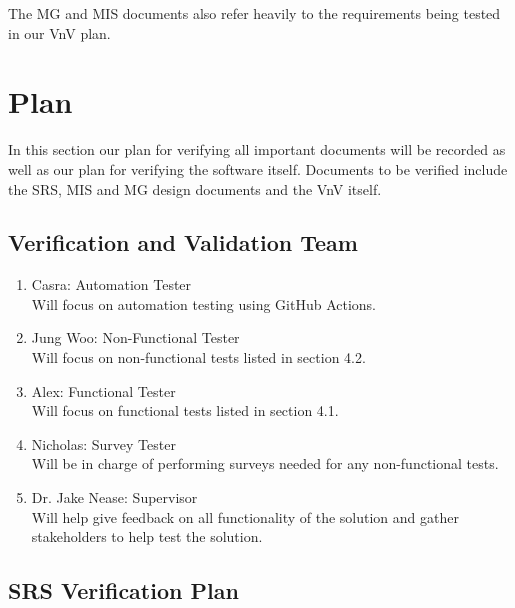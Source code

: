 \documentclass[12pt, titlepage]{article}
\begin{document}
The MG and MIS documents also refer heavily to the requirements being tested
in our VnV plan.

\section{Plan}


In this section our plan for verifying all important documents will be
recorded as well as our plan for verifying the software itself. Documents to
be verified include the SRS, MIS and MG design documents and the VnV itself.

\subsection{Verification and Validation Team}


\begin{enumerate}
  \item Casra: Automation Tester\\
  Will focus on automation testing using GitHub Actions.
  \item Jung Woo: Non-Functional Tester\\
  Will focus on non-functional tests listed in section 4.2.
  \item Alex: Functional Tester\\
  Will focus on functional tests listed in section 4.1.
  \item Nicholas: Survey Tester\\
  Will be in charge of performing surveys needed for any non-functional tests.
  \item Dr. Jake Nease: Supervisor\\
  Will help give feedback on all functionality of the solution and gather
  stakeholders to help test the solution.
\end{enumerate}

\subsection{SRS Verification Plan}

\end{document}
